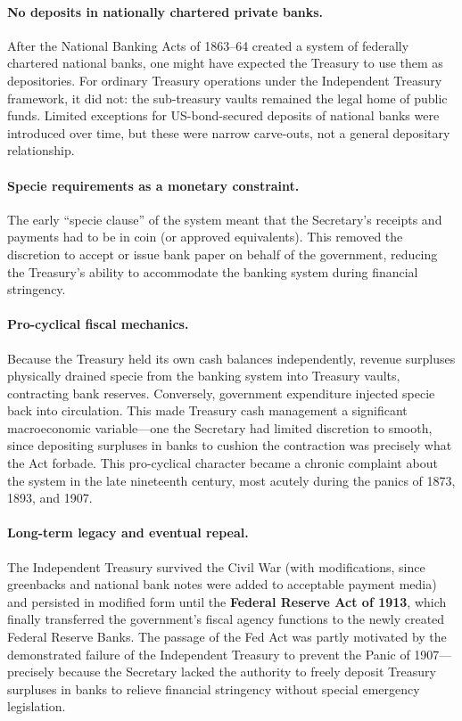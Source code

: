 \documentclass[12pt]{article}
\begin{document}
\paragraph{No deposits in nationally chartered private banks.}
After the National Banking Acts of 1863--64 created a system of
federally chartered national banks, one might have expected the Treasury
to use them as depositories.  For ordinary Treasury operations under the
Independent Treasury framework, it did not: the sub-treasury vaults
remained the legal home of public funds.  Limited exceptions for
US-bond-secured deposits of national banks were introduced over time,
but these were narrow carve-outs, not a general depositary relationship.

\paragraph{Specie requirements as a monetary constraint.}
The early ``specie clause'' of the system meant that the Secretary's
receipts and payments had to be in coin (or approved equivalents).  This
removed the discretion to accept or issue bank paper on behalf of the
government, reducing the Treasury's ability to accommodate the banking
system during financial stringency.

\paragraph{Pro-cyclical fiscal mechanics.}
Because the Treasury held its own cash balances independently, revenue
surpluses physically drained specie from the banking system into
Treasury vaults, contracting bank reserves.  Conversely, government
expenditure injected specie back into circulation.  This made Treasury
cash management a significant macroeconomic variable---one the Secretary
had limited discretion to smooth, since depositing surpluses in banks to
cushion the contraction was precisely what the Act forbade.  This
pro-cyclical character became a chronic complaint about the system in
the late nineteenth century, most acutely during the panics of 1873,
1893, and 1907.

\paragraph{Long-term legacy and eventual repeal.}
The Independent Treasury survived the Civil War (with modifications,
since greenbacks and national bank notes were added to acceptable payment
media) and persisted in modified form until the \textbf{Federal Reserve
Act of 1913}, which finally transferred the government's fiscal agency
functions to the newly created Federal Reserve Banks.  The passage of
the Fed Act was partly motivated by the demonstrated failure of the
Independent Treasury to prevent the Panic of 1907---precisely because
the Secretary lacked the authority to freely deposit Treasury surpluses
in banks to relieve financial stringency without special emergency
legislation.
\end{document}
